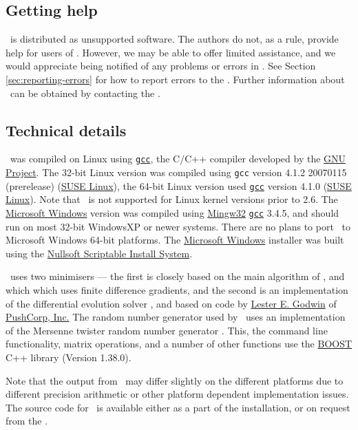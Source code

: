 \subsection{Getting help}

\SPM\ is distributed as unsupported software. The authors do not, as a rule, provide help for users of \SPM. However, we may be able to offer limited assistance, and we would appreciate being notified of any problems or errors in \SPM. See Section \ref{sec:reporting-errors} for how to report errors to the \authors. Further information about \SPM\ can be obtained by contacting the \authors.

\subsection{Technical details}

\SPM\ was compiled on Linux using \href{http://gcc.gnu.org}{\texttt{gcc}}, the C/C++ compiler developed by the \href{http://gcc.gnu.org}{GNU Project}. The 32-bit Linux  version was compiled using \texttt{gcc} version 4.1.2 20070115 (prerelease) (\href{http://www.opensuse.org/}{SUSE Linux}), the 64-bit Linux version used \href{http://gcc.gnu.org}{\texttt{gcc}} version 4.1.0 (\href{http://www.opensuse.org/}{SUSE Linux}). Note that \SPM\ is not supported for Linux kernel versions prior to 2.6. The \href{http://www.microsoft.com}{Microsoft Windows} version was compiled using \href{http://www.mingw.org}{Mingw32} \href{http://gcc.gnu.org}{\texttt{gcc}} 3.4.5, and should run on most 32-bit WindowsXP or newer systems. There are no plans to port \SPM\ to Microsoft Windows 64-bit platforms. The \href{http://www.microsoft.com}{Microsoft Windows} installer was built using the \href{http://nsis.sourceforge.net/Main_Page}{Nullsoft Scriptable Install System}.

\SPM\ uses two minimisers --- the first is closely based on the main algorithm of \cite{779}, and which which uses finite difference gradients, and the second is an implementation of the differential evolution solver \citep{1442}, and based on code by \href{mailto:<godwin@pushcorp.com>}{Lester E. Godwin} of \href{http://www.pushcorp.com}{PushCorp, Inc.} The random number generator used by \SPM\ uses an implementation of the Mersenne twister random number generator \citep{796}. This, the command line functionality, matrix operations, and a number of other functions use the \href{http://www.boost.org/}{BOOST} C++ library (Version 1.38.0).

Note that the output from \SPM\ may differ slightly on the different platforms due to different precision arithmetic or other platform dependent implementation issues. The source code for \SPM\ is available either as a part of the installation, or on request from the \authors.


